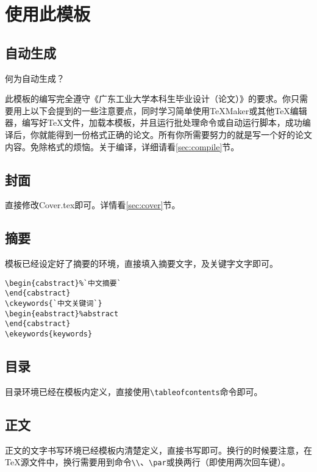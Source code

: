 \chapter{使用此模板}

\section{自动生成}
何为自动生成？

此模板的编写完全遵守《广东工业大学本科生毕业设计（论文）》的要求。你只需要用上以下会提到的一些注意要点，同时学习简单使用\TeX{}Maker或其他\TeX{}编辑器，编写好\TeX{}文件，加载本模板，并且运行批处理命令或自动运行脚本，成功编译后，你就能得到一份格式正确的论文。所有你所需要努力的就是写一个好的论文内容。免除格式的烦恼。关于编译，详细请看\ref{sec:compile}节。

\section{封面}
直接修改Cover.tex即可。详情看\ref{sec:cover}节。

\section{摘要}
模板已经设定好了摘要的环境，直接填入摘要文字，及关键字文字即可。
\begin{lstlisting}
\begin{cabstract}%`中文摘要`
\end{cabstract}
\ckeywords{`中文关键词`}
\begin{eabstract}%abstract
\end{cabstract}
\ekeywords{keywords}
\end{lstlisting}

\section{目录}
目录环境已经在模板内定义，直接使用\verb|\tableofcontents|命令即可。

\section{正文}
正文的文字书写环境已经模板内清楚定义，直接书写即可。换行的时候要注意，在\TeX{}源文件中，换行需要用到命令\verb|\\|、\verb|\par|或换两行（即使用两次回车键）。

